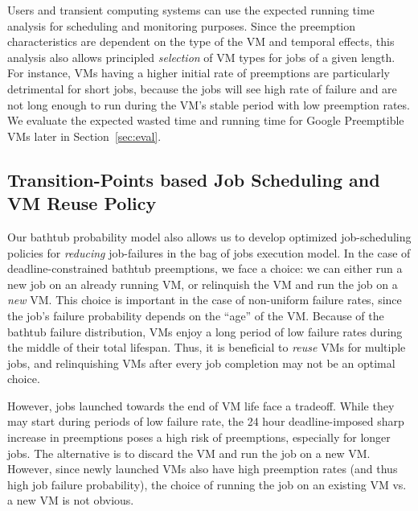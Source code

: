 Users and transient computing systems can use the expected running time analysis for scheduling and monitoring purposes.
Since the preemption characteristics are dependent on the type of the VM and temporal effects, this analysis also allows principled \emph{selection} of VM types for jobs of a given length. 
For instance, VMs having a higher initial rate of preemptions are particularly detrimental for short jobs, because the jobs will see high rate of failure and are not long enough to run during the VM's stable period with low  preemption rates. 
We evaluate the expected wasted time and running time for Google Preemptible VMs later in Section~\ref{sec:eval}. 

\vspace*{\subsecspace}
\subsection{Transition-Points based Job Scheduling and VM Reuse Policy}

%
Our bathtub probability model also allows us to develop optimized job-scheduling policies for \emph{reducing} job-failures in the bag of jobs execution model. 
%
%
In the case of deadline-constrained bathtub preemptions, we face a choice: we can either run a new job on an already running VM, or relinquish the VM and run the job on a \emph{new} VM. 
This choice is important in the case of non-uniform failure rates, since the job's failure probability depends on the ``age'' of the VM. 
Because of the bathtub failure distribution, VMs enjoy a long period of low failure rates during the middle of their total lifespan.
Thus, it is beneficial to \emph{reuse} VMs for multiple jobs, and relinquishing VMs after every job completion may not be an optimal choice. 


However, jobs launched towards the end of VM life face a tradeoff.
While they may start during periods of low failure rate, the 24 hour deadline-imposed sharp increase in preemptions poses a high risk of preemptions, especially for longer jobs.
The alternative is to discard the VM and run the job on a new VM. 
However, since newly launched VMs also have high preemption rates (and thus high job failure probability), the choice of running the job on an existing VM vs. a new VM is not obvious. 

